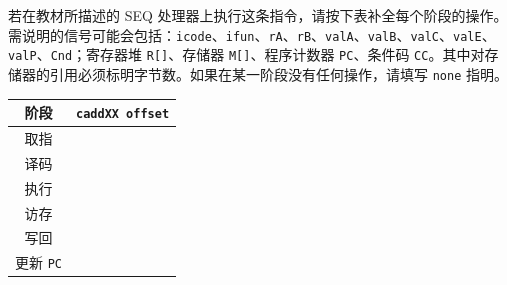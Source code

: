 \begin{problems}
        若在教材所描述的 SEQ 处理器上执行这条指令，请按下表补全每个阶段的操作。需说明的信号可能会包括：\verb|icode|、\verb|ifun|、\verb|rA|、\verb|rB|、\verb|valA|、\verb|valB|、\verb|valC|、\verb|valE|、\verb|valP|、\verb|Cnd|；寄存器堆 \verb|R[]|、存储器 \verb|M[]|、程序计数器 \verb|PC|、条件码 \verb|CC|。其中对存储器的引用必须标明字节数。如果在某一阶段没有任何操作，请填写 \texttt{none} 指明。
        \begin{table}[H]
            \centering
            \begin{tabular}{|c|c|}
                \hline
                阶段 & {\qquad \qquad \qquad \qquad} \verb|caddXX offset| {\qquad \qquad \qquad \qquad} \\ \hline
                取指 & \rule{0pt}{10ex} \\ \hline
                译码 & \rule{0pt}{10ex} \\ \hline
                执行 & \rule{0pt}{10ex} \\ \hline
                访存 & \rule{0pt}{10ex} \\ \hline
                写回 & \rule{0pt}{10ex} \\ \hline
                更新 \verb|PC| & \rule{0pt}{10ex} \\ \hline
            \end{tabular}
        \end{table}
    \end{problems}